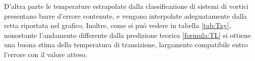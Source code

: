 \documentclass{article}
\begin{document}
D'altra parte le temperature estrapolate dalla classificazione di sistemi di vortici presentano barre d'errore contenute, e vengono interpolate adeguatamente dalla retta riportata nel grafico.
Inoltre, come si può vedere in tabella \ref{tab:Txy}, nonostante l'andamento differente dalla predizione teorica \ref{formula:TL} si ottiene una buona stima della temperatura di transizione, largamente compatibile entro l'errore con il valore atteso.






\end{document}
